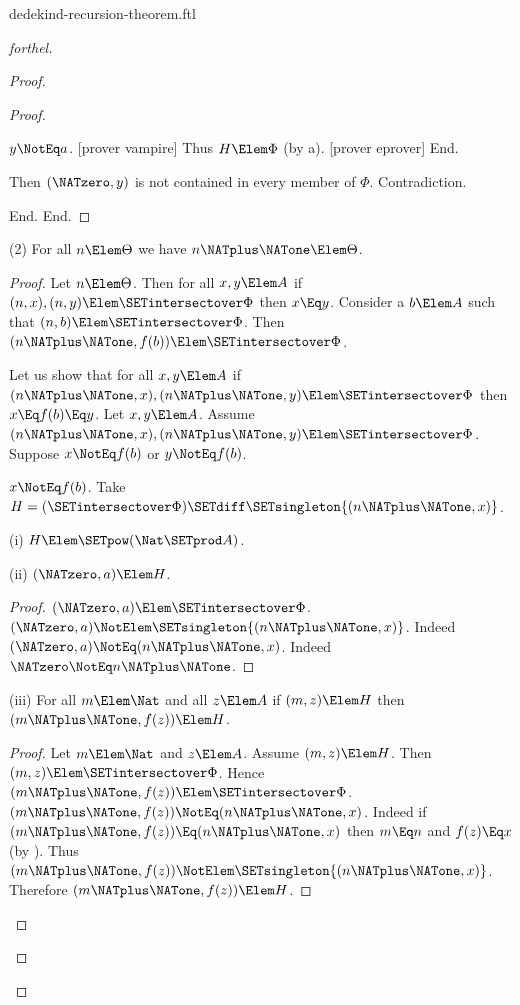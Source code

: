 \documentclass{stex}
\begin{document}
\begin{smodule}{dedekind-recursion-theorem.ftl}
\begin{proof}[forthel]
\begin{proof}
\begin{proof}
\begin{case}{$y \NotEq a$.}
              [prover vampire]
              Thus $H \Elem \Phi$ (by a).
              [prover eprover]
            End.

            Then $(\NATzero,y)$ is not contained in every member of $\Phi$.
            Contradiction.
          \end{case}
        End.
      End.
    \end{proof}

    (2) For all $n \Elem \Theta$ we have $n \NATplus \NATone \Elem \Theta$.
    \begin{proof}
      Let $n \Elem \Theta$.
      Then for all $x, y \Elem A$ if $(n, x), (n, y) \Elem \SETintersectover \Phi$ then
      $x \Eq y$.
      Consider a $b \Elem A$ such that $(n,b) \Elem \SETintersectover \Phi$.
      Then $(n \NATplus \NATone, f(b)) \Elem \SETintersectover \Phi$.

      Let us show that for all $x, y \Elem A$ if $(n \NATplus \NATone, x),
      (n \NATplus \NATone, y) \Elem \SETintersectover \Phi$ then $x \Eq f(b) \Eq y$.
        Let $x, y \Elem A$.
        Assume $(n \NATplus \NATone, x), (n \NATplus \NATone, y) \Elem \SETintersectover \Phi$.
        Suppose $x \NotEq f(b)$ or $y \NotEq f(b)$.

        \begin{case}{$x \NotEq f(b)$.}
          Take $H = (\SETintersectover \Phi) \SETdiff \SETsingleton{(n \NATplus \NATone,x)}$.

          (i) $H \Elem \SETpow(\Nat \SETprod A)$.

          (ii) $(\NATzero,a) \Elem H$.
          \begin{proof}
            $(\NATzero,a) \Elem \SETintersectover \Phi$.
            $(\NATzero,a) \NotElem \SETsingleton{(n \NATplus \NATone,x)}$.
            Indeed $(\NATzero,a) \NotEq (n \NATplus \NATone,x)$.
            Indeed $\NATzero \NotEq n \NATplus \NATone$.
          \end{proof}

          (iii) For all $m \Elem \Nat$ and all $z \Elem A$ if $(m,z) \Elem H$ then $(m \NATplus \NATone,f(z)) \Elem H$.
          \begin{proof}
            Let $m \Elem \Nat$ and $z \Elem A$.
            Assume $(m,z) \Elem H$.
            Then $(m,z) \Elem \SETintersectover \Phi$.
            Hence $(m \NATplus \NATone,f(z)) \Elem \SETintersectover \Phi$.
            $(m \NATplus \NATone,f(z)) \NotEq (n \NATplus \NATone,x)$.
            Indeed if $(m \NATplus \NATone,f(z)) \Eq (n \NATplus \NATone,x)$ then $m \Eq n$ and $f(z) \Eq x$ (by ).
            Thus $(m \NATplus \NATone,f(z)) \NotElem \SETsingleton{(n \NATplus \NATone,x)}$.
            Therefore $(m \NATplus \NATone,f(z)) \Elem H$.
          \end{proof}


\end{case}
\end{proof}
\end{proof}
\end{proof}
\end{smodule}
\end{document}
